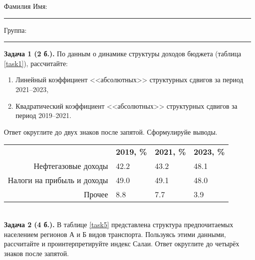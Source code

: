 \documentclass{article}
\begin{document}
\mbox{}

\vspace{-36pt}

\begin{center}
	\begin{tcolorbox}[colback=white, boxrule=0.20ex, sharp corners = all, height=25pt, colframe=black, valign=top]
		\begin{center}
			Фамилия Имя:\hspace{1.5pt}\rule{190pt}{0pt}\hspace{50pt}Группа:\hspace{1.5pt}\rule{60pt}{0pt}
		\end{center}
	\end{tcolorbox}
\end{center}
\vspace{3pt}

\textbf{Задача 1 (2 б.).} По данным о динамике структуры доходов бюджета (таблица \ref{task1}), рассчитайте:
\begin{enumerate}[leftmargin=40pt]
\item Линейный коэффициент <<абсолютных>> структурных сдвигов за период 2021--2023,
\item Квадратический коэффициент <<абсолютных>> структурных сдвигов за период 2019--2021.\medskip
\end{enumerate}

Ответ округлите до двух знаков после запятой. Сформулируйе выводы.\\

\begin{minipage}{\textwidth}
\centering
\begin{tabularx}{0.8\textwidth}{rYYY}
\toprule
 & \textbf{2019, \%} & \textbf{2021, \%} & \textbf{2023, \%} \\
\cmidrule(lr){2-2}\cmidrule(lr){3-3}\cmidrule(lr){4-4}
Нефтегазовые доходы & 42.2 & 43.2 & 48.1 \\

Налоги на прибыль и доходы & 49.0 & 49.1 & 48.0 \\

Прочее & 8.8 & 7.7 & 3.9 \\
\bottomrule
\end{tabularx}
\label{task1}
\end{minipage} \\[35pt]

\textbf{Задача 2 (4 б.).} В таблице \ref{task5} представлена структура предпочитаемых населением регионов А и Б видов транспорта. Пользуясь этими данными, рассчитайте и проинтерпретируйте индекс Салаи. Ответ округлите до четырёх знаков после запятой.\\
\end{document}
